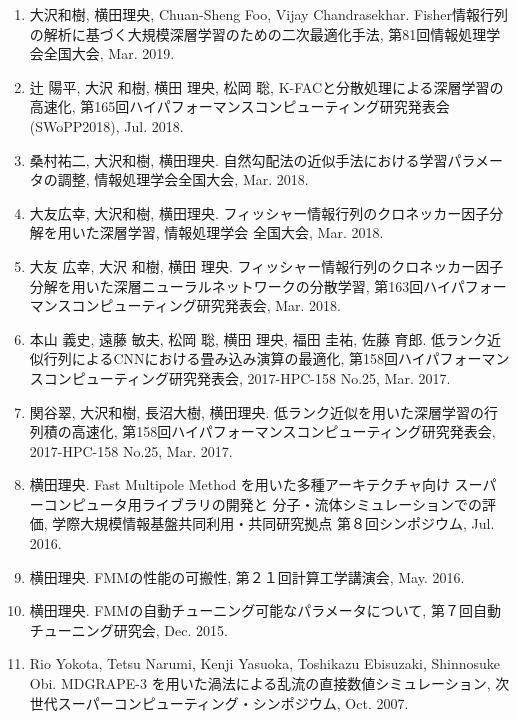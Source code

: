 \documentclass[margin,line]{cv}
\begin{document}
\begin{resume}
\begin{enumerate}
\item 大沢和樹, 横田理央, Chuan-Sheng Foo, Vijay Chandrasekhar. Fisher情報行列の解析に基づく大規模深層学習のための二次最適化手法, 第81回情報処理学会全国大会, Mar. 2019.

\item 辻 陽平, 大沢 和樹, 横田 理央, 松岡 聡, K-FACと分散処理による深層学習の高速化, 第165回ハイパフォーマンスコンピューティング研究発表会 (SWoPP2018), Jul. 2018.

\item 桑村祐二, 大沢和樹, 横田理央. 自然勾配法の近似手法における学習パラメータの調整, 情報処理学会全国大会, Mar. 2018.

\item 大友広幸, 大沢和樹, 横田理央. フィッシャー情報行列のクロネッカー因子分解を用いた深層学習, 情報処理学会 全国大会, Mar. 2018.

\item 大友 広幸, 大沢 和樹, 横田 理央. フィッシャー情報行列のクロネッカー因子分解を用いた深層ニューラルネットワークの分散学習, 第163回ハイパフォーマンスコンピューティング研究発表会, Mar. 2018.

\item 本山 義史, 遠藤 敏夫, 松岡 聡, 横田 理央, 福田 圭祐, 佐藤 育郎. 低ランク近似行列によるCNNにおける畳み込み演算の最適化, 第158回ハイパフォーマンスコンピューティング研究発表会, 2017-HPC-158 No.25, Mar. 2017.

\item 関谷翠, 大沢和樹, 長沼大樹, 横田理央. 低ランク近似を用いた深層学習の行列積の高速化, 第158回ハイパフォーマンスコンピューティング研究発表会, 2017-HPC-158 No.25, Mar. 2017.

\item 横田理央. Fast Multipole Method を用いた多種アーキテクチャ向け スーパーコンピュータ用ライブラリの開発と 分子・流体シミュレーションでの評価, 学際大規模情報基盤共同利用・共同研究拠点 第８回シンポジウム, Jul. 2016.

\item 横田理央. FMMの性能の可搬性, 第２１回計算工学講演会, May. 2016.

\item 横田理央. FMMの自動チューニング可能なパラメータについて, 第７回自動チューニング研究会, Dec. 2015.

\item Rio Yokota, Tetsu Narumi, Kenji Yasuoka, Toshikazu Ebisuzaki, Shinnosuke Obi. MDGRAPE-3 を用いた渦法による乱流の直接数値シミュレーション, 次世代スーパーコンピューティング・シンポジウム, Oct. 2007.


\end{enumerate}
\end{resume}
\end{document}
